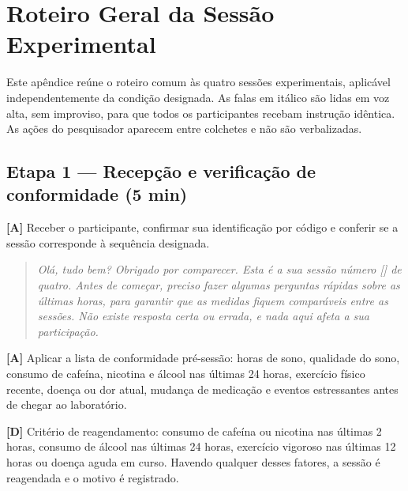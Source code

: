 %
%
%

\chapter{Roteiro Geral da Sessão Experimental}\label{ap:roteiro-geral}

Este apêndice reúne o roteiro comum às quatro sessões experimentais, aplicável independentemente da condição designada. As falas em itálico são lidas em voz alta, sem improviso, para que todos os participantes recebam instrução idêntica. As ações do pesquisador aparecem entre colchetes e não são verbalizadas.

\section*{Etapa 1 --- Recepção e verificação de conformidade (5 min)}

\noindent\textbf{[A]} Receber o participante, confirmar sua identificação por código e conferir se a sessão corresponde à sequência designada.

\begin{quote}\itshape
Olá, tudo bem? Obrigado por comparecer. Esta é a sua sessão número [\underline{\hspace{1cm}}] de quatro. Antes de começar, preciso fazer algumas perguntas rápidas sobre as últimas horas, para garantir que as medidas fiquem comparáveis entre as sessões. Não existe resposta certa ou errada, e nada aqui afeta a sua participação.
\end{quote}

\noindent\textbf{[A]} Aplicar a lista de conformidade pré-sessão: horas de sono, qualidade do sono, consumo de cafeína, nicotina e álcool nas últimas 24 horas, exercício físico recente, doença ou dor atual, mudança de medicação e eventos estressantes antes de chegar ao laboratório.

\noindent\textbf{[D]} Critério de reagendamento: consumo de cafeína ou nicotina nas últimas 2 horas, consumo de álcool nas últimas 24 horas, exercício vigoroso nas últimas 12 horas ou doença aguda em curso. Havendo qualquer desses fatores, a sessão é reagendada e o motivo é registrado.

